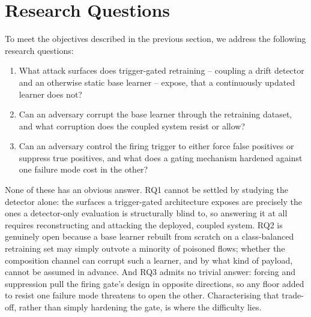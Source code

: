 \section{Research Questions}
\label{sec:research questions}
To meet the objectives described in the previous section, we address the following research questions:
\begin{enumerate}
    \item What attack surfaces does trigger-gated retraining -- coupling a drift detector and an otherwise static base learner -- expose, that a continuously updated learner does not?

    \item Can an adversary corrupt the base learner through the retraining dataset, and what corruption does the coupled system resist or allow?

    \item Can an adversary control the firing trigger to either force false positives or suppress true positives, and what does a gating mechanism hardened against one failure mode cost in the other?
\end{enumerate}

None of these has an obvious answer. RQ1 cannot be settled by studying the detector alone: the surfaces a trigger-gated architecture exposes are precisely the ones a detector-only evaluation is structurally blind to, so answering it at all requires reconstructing and attacking the deployed, coupled system. RQ2 is genuinely open because a base learner rebuilt from scratch on a class-balanced retraining set may simply outvote a minority of poisoned flows; whether the composition channel can corrupt such a learner, and by what kind of payload, cannot be assumed in advance. And RQ3 admits no trivial answer: forcing and suppression pull the firing gate's design in opposite directions, so any floor added to resist one failure mode threatens to open the other. Characterising that trade-off, rather than simply hardening the gate, is where the difficulty lies.

